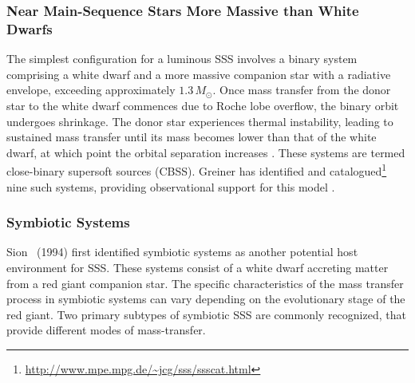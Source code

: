 			\subsubsection{Near Main-Sequence Stars More Massive than White Dwarfs}
				The simplest configuration for a luminous SSS involves a binary system comprising a white dwarf and a more massive companion star with a radiative envelope, exceeding approximately $1.3\,M_{\odot}$. Once mass transfer from the donor star to the white dwarf commences due to Roche lobe overflow, the binary orbit undergoes shrinkage. The donor star experiences thermal instability, leading to sustained mass transfer until its mass becomes lower than that of the white dwarf, at which point the orbital separation increases \cite{paczynski71}. These systems are termed close-binary supersoft sources (CBSS). Greiner has identified and catalogued\footnote{\url{http://www.mpe.mpg.de/~jcg/sss/ssscat.html}} nine such systems, providing observational support for this model \cite{greiner2000catalog}.
				
			\subsubsection{Symbiotic Systems}
				Sion \etal\ (1994) \cite{sion94} first identified symbiotic systems as another potential host environment for SSS. These systems consist of a white dwarf accreting matter from a red giant companion star. The specific characteristics of the mass transfer process in symbiotic systems can vary depending on the evolutionary stage of the red giant. Two primary subtypes of symbiotic SSS are commonly recognized, that provide different modes of mass-transfer.
				
